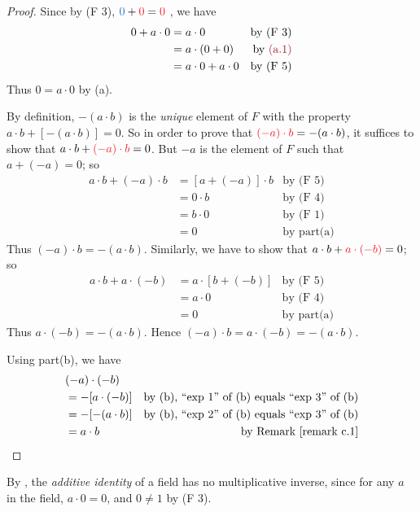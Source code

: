 \begin{proof}
Since by (F 3), \(\BLUE{0} + \RED{0} = \RED{0}\) , we have
\begin{align*}
    0 + a \cdot 0 & = a \cdot 0 & \text{by (F 3)} \\
        & = a \cdot (0 + 0) & \text{by \MAROON{(a.1)}} \\
        & = a \cdot 0 + a \cdot 0 & \text{by (F 5)}
\end{align*}
Thus \(0 = a \cdot 0\) by (a).

\item By definition, \(-(a \cdot b)\) is the \emph{unique} element of \(F\) with the property \(a \cdot b + [-(a \cdot b)] = 0\).
So in order to prove that \(\RED{(-a) \cdot b} = -(a \cdot b)\), it suffices to show that \(a \cdot b + \RED{(-a) \cdot b} = 0\).
But \(-a\) is the element of \(F\) such that \(a + (-a) = 0\);
so
\begin{align*}
    a \cdot b + (-a) \cdot b & = [a + (-a)] \cdot b & \text{by (F 5)} \\
        & = 0 \cdot b & \text{by (F 4)} \\
        & = b \cdot 0 & \text{by (F 1)} \\
        & = 0 & \text{by part(a)}
\end{align*}
Thus \((-a) \cdot b = -(a \cdot b)\).
Similarly, we have to show that \(a \cdot b + \RED{a \cdot (-b)} = 0\);
so
\begin{align*}
    a \cdot b + a \cdot (-b) & = a \cdot [b + (-b)] & \text{by (F 5)} \\
        & = a \cdot 0 & \text{by (F 4)} \\
        & = 0 & \text{by part(a)}
\end{align*}
Thus \(a \cdot (-b) = -(a \cdot b)\).
Hence \((-a) \cdot b = a \cdot (-b) = -(a \cdot b)\).

\item Using part(b), we have
\begin{align*}
    & (-a) \cdot (-b) \\
    & = -[a \cdot (-b)] & \text{by (b), ``exp 1'' of (b) equals ``exp 3'' of (b)} \\
    & = -[-(a \cdot b)] & \text{by (b), ``exp 2'' of (b) equals ``exp 3'' of (b)} \\
    & = a \cdot b & \text{by \RMK{c.1}}
\end{align*}
\end{proof}

\begin{appendix corollary} \label{corollary c.2.1}
By , the \emph{additive identity} of a field has no multiplicative inverse, since for any \(a\) in the field, \(a \cdot 0 = 0\), and \(0 \ne 1\) by (F 3).
\end{appendix corollary}

